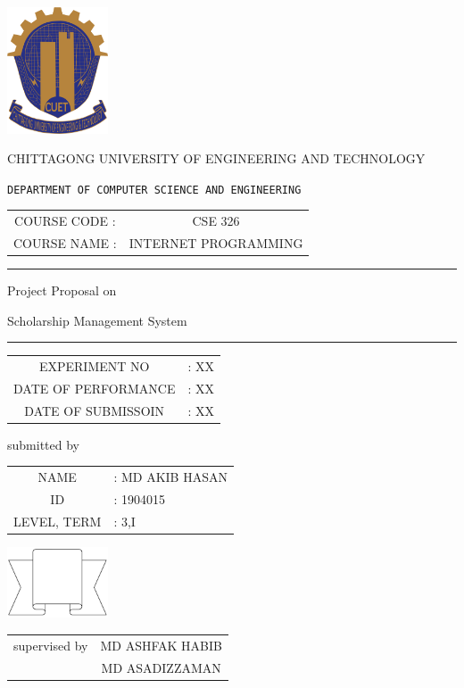 \documentclass[a4paper,11pt]{report}
\begin{document}
\begin{titlepage}
\scshape
\centering

\includegraphics[width=3cm, keepaspectratio]{cuet.png} \par \vspace{0.1cm}
\begin{Large}
	CHITTAGONG UNIVERSITY OF ENGINEERING AND TECHNOLOGY
\end{Large}
\par
\texttt{DEPARTMENT OF COMPUTER SCIENCE AND ENGINEERING}
\vspace{2cm}

\begin{tabular}{cc}
	COURSE CODE : & CSE 326                 \\
	COURSE NAME : & INTERNET PROGRAMMING
\end{tabular}
\vspace{1cm}

\raisebox{-\baselineskip}{\rule{\textwidth}{1px}}
\rule{\textwidth}{1px}

\vspace{0.2cm}
{\Large{{Project Proposal on}}}\par \vspace{0.5cm}
\huge{{Scholarship Management System }}
\rule{\textwidth}{2px}

\vspace{1cm}
\large
\begin{tabular}{cl}
	EXPERIMENT NO       & : XX \\
	DATE OF PERFORMANCE & : XX \\
	DATE OF SUBMISSOIN  & : XX
\end{tabular}

\vspace{2cm}
\normalsize
submitted by

\parbox[l]{8cm}{

	\begin{tabular}{cl}
		NAME        & : MD AKIB HASAN \\
		ID          & : 1904015       \\
		LEVEL, TERM & : 3,I
	\end{tabular}
}
\parbox[r]{8cm}{
	\begin{center}
		\includegraphics[width=3cm, keepaspectratio]{remarks.png}
	\end{center}
}

\vspace{1cm}
\begin{tabular}{cc}
	supervised by & MD ASHFAK HABIB \\
	              & MD ASADIZZAMAN
\end{tabular}

\vfill
\end{titlepage}
\end{document}
